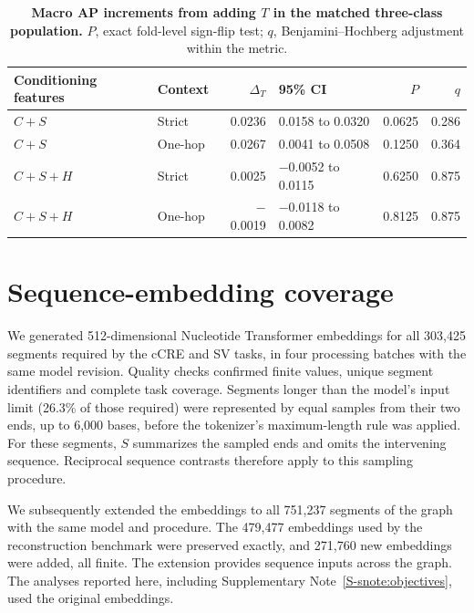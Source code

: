 \documentclass[11pt]{article}
\begin{document}
\begin{bibunit}[unsrtnat]
\begin{table}[H]
\centering
\caption{\textbf{Macro AP increments from adding $T$ in the matched three-class population.} $P$, exact fold-level sign-flip test; $q$, Benjamini--Hochberg adjustment within the metric.}
\label{S-stab:svmatched}
\footnotesize
\begin{tabular}{@{}llrlrr@{}}
\toprule
Conditioning features & Context & $\Delta_T$ & 95\% CI & $P$ & $q$ \\
\midrule
$C+S$ & Strict & 0.0236 & 0.0158 to 0.0320 & 0.0625 & 0.286 \\
$C+S$ & One-hop & 0.0267 & 0.0041 to 0.0508 & 0.1250 & 0.364 \\
$C+S+H$ & Strict & 0.0025 & $-$0.0052 to 0.0115 & 0.6250 & 0.875 \\
$C+S+H$ & One-hop & $-$0.0019 & $-$0.0118 to 0.0082 & 0.8125 & 0.875 \\
\bottomrule
\end{tabular}
\end{table}

\section{Sequence-embedding coverage}
\label{S-snote:coverage}

We generated 512-dimensional Nucleotide Transformer embeddings for all 303,425 segments required by the cCRE and SV tasks, in four processing batches with the same model revision. Quality checks confirmed finite values, unique segment identifiers and complete task coverage. Segments longer than the model's input limit (26.3\% of those required) were represented by equal samples from their two ends, up to 6,000 bases, before the tokenizer's maximum-length rule was applied. For these segments, $S$ summarizes the sampled ends and omits the intervening sequence. Reciprocal sequence contrasts therefore apply to this sampling procedure.

We subsequently extended the embeddings to all 751,237 segments of the graph with the same model and procedure. The 479,477 embeddings used by the reconstruction benchmark were preserved exactly, and 271,760 new embeddings were added, all finite. The extension provides sequence inputs across the graph. The analyses reported here, including Supplementary Note~\ref{S-snote:objectives}, used the original embeddings.


\end{bibunit}
\end{document}
